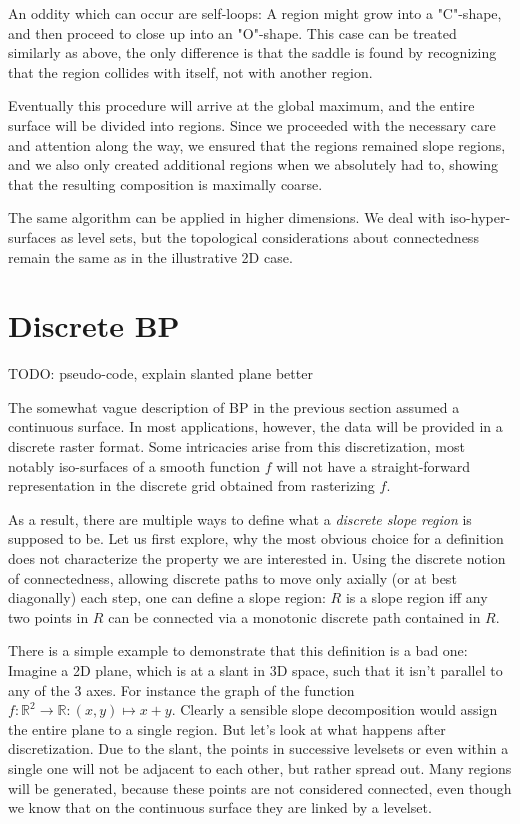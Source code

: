 \documentclass[a4paper,12pt,notitlepage,fullpage]{paper}
\theoremstyle{plain}
\theoremstyle{definition}
\begin{document}
An oddity which can occur are self-loops: A region might grow into a "C"-shape, and then proceed to close up into an "O"-shape.
This case can be treated similarly as above, the only difference is that the saddle is found by recognizing that the region collides with itself, not with another region.

Eventually this procedure will arrive at the global maximum, and the entire surface will be divided into regions.
Since we proceeded with the necessary care and attention along the way, we ensured that the regions remained slope regions, and we also only created additional regions when we absolutely had to, showing that the resulting composition is maximally coarse.

The same algorithm can be applied in higher dimensions.
We deal with iso-hyper-surfaces as level sets, but the topological considerations about connectedness remain the same as in the illustrative 2D case.

\section{Discrete BP}
\label{sec:details}

TODO: pseudo-code, explain slanted plane better

The somewhat vague description of BP in the previous section assumed a continuous surface.
In most applications, however, the data will be provided in a discrete raster format.
Some intricacies arise from this discretization, most notably iso-surfaces of a smooth function $f$ will not have a straight-forward representation in the discrete grid obtained from rasterizing $f$.

As a result, there are multiple ways to define what a \emph{discrete slope region} is supposed to be.
Let us first explore, why the most obvious choice for a definition does not characterize the property we are interested in.
Using the discrete notion of connectedness, allowing discrete paths to move only axially (or at best diagonally) each step, one can define a slope region:
$R$ is a slope region iff any two points in $R$ can be connected via a monotonic discrete path contained in $R$.

There is a simple example to demonstrate that this definition is a bad one: Imagine a 2D plane, which is at a slant in 3D space, such that it isn't parallel to any of the 3 axes.
For instance the graph of the function $f: \mathbb{R}^2 \rightarrow \mathbb{R}: (x,y)\mapsto x+y$.
Clearly a sensible slope decomposition would assign the entire plane to a single region.
But let's look at what happens after discretization.
Due to the slant, the points in successive levelsets or even within a single one will not be adjacent to each other, but rather spread out.
Many regions will be generated, because these points are not considered connected, even though we know that on the continuous surface they are linked by a levelset.
\end{document}
